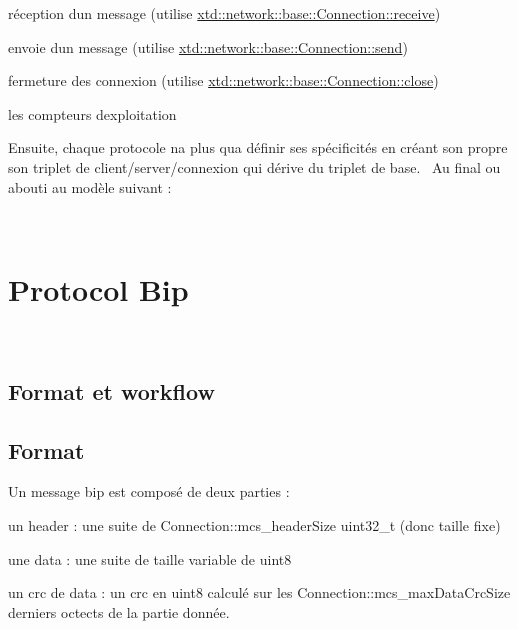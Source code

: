 \begin{DoxyItemize}
\begin{DoxyItemize}
\item réception d\textquotesingle{}un message (utilise \hyperlink{classxtd_1_1network_1_1base_1_1Connection_a09146c9c2dbf1ad85867fd0afab15c0c}{xtd\+::network\+::base\+::\+Connection\+::receive})
\item envoie d\textquotesingle{}un message (utilise \hyperlink{classxtd_1_1network_1_1base_1_1Connection_a8ebc5958cf7d27a902bd75a55c4648bf}{xtd\+::network\+::base\+::\+Connection\+::send})
\item fermeture des connexion (utilise \hyperlink{classxtd_1_1network_1_1base_1_1Connection_a73097d339a3716c05fee7ee19753ee4a}{xtd\+::network\+::base\+::\+Connection\+::close})
\item les compteurs d\textquotesingle{}exploitation
\end{DoxyItemize}
\end{DoxyItemize}

Ensuite, chaque protocole n\textquotesingle{}a plus qu\textquotesingle{}a définir ses spécificités en créant son propre son triplet de client/server/connexion qui dérive du triplet de base.~\newline
 Au final ou abouti au modèle suivant \+:



~\newline


 \hypertarget{index_sec_bip}{}\section{Protocol Bip}\label{index_sec_bip}




~\newline
 \hypertarget{index_ssec_bip_cnx}{}\subsection{Format et workflow}\label{index_ssec_bip_cnx}
\subsection*{Format }

Un message bip est composé de deux parties \+:
\begin{DoxyItemize}
\item un header \+: une suite de Connection\+::mcs\+\_\+header\+Size uint32\+\_\+t (donc taille fixe)
\item une data \+: une suite de taille variable de uint8
\item un crc de data \+: un crc en uint8 calculé sur les Connection\+::mcs\+\_\+max\+Data\+Crc\+Size derniers octects de la partie donnée.
\end{DoxyItemize}

